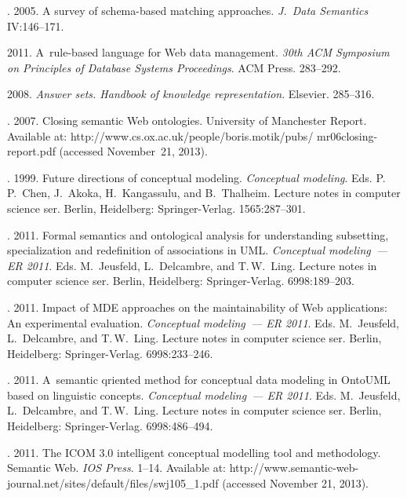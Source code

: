 \begin{multicols}{2}
{{\begin{thebibliography}{99}
. 2005. A survey of schema-based matching approaches.
\textit{J.~Data Semantics} IV:146--171.

 2011. A~rule-based
language for Web data management. \textit{30th ACM Symposium on Principles of
Database Systems Proceedings}. ACM Press. 283--292.


 2008. \textit{Answer sets. Handbook of knowledge representation}.
Elsevier. 285--316.

. 2007. Closing semantic Web ontologies. University of
Manchester Report. Available at: {\sf
http://www.cs.ox.ac.uk/people/boris.motik/pubs/ mr06closing-report.pdf} (accessed
November~21, 2013).

. 1999. Future directions of conceptual
modeling. \textit{Conceptual modeling}. Eds. P.\,P.~Chen, J.~Akoka, 
H.~Kangassulu, and B.~Thalheim.
Lecture notes in computer science ser. Berlin, Heidelberg:
Springer-Verlag. 1565:287--301.

. 2011. Formal
semantics and ontological analysis for understanding subsetting, specialization and
redefinition of associations in UML. \textit{Conceptual modeling~--- ER 2011}.
Eds. M.~Jeusfeld, L.~Delcambre, and T.\,W.~Ling. Lecture notes in computer
science ser. Berlin, Heidelberg: Springer-Verlag. 6998:189--203.

. 2011. Impact of
MDE approaches on the maintainability of Web applications: An experimental evaluation.
\textit{Conceptual modeling~--- ER 2011}.
Eds. M.~Jeusfeld, L.~Delcambre, and T.\,W.~Ling. Lecture notes in computer
science ser. Berlin, Heidelberg: Springer-Verlag. 6998:233--246.

. 2011. A~semantic
qriented method for conceptual data modeling in \mbox{OntoUML} based on linguistic concepts.
\textit{Conceptual modeling~--- ER 2011}.
Eds. M.~Jeusfeld, L.~Delcambre, and T.\,W.~Ling. Lecture notes in computer
science ser. Berlin, Heidelberg: Springer-Verlag. 6998:486--494.

. 2011. The ICOM 3.0 intelligent
conceptual modelling tool and methodology. Semantic Web. \textit{IOS Press}. 1--14.
Available at: {\sf http://www.semantic-web-journal.net/sites/default/files/swj105\_1.pdf}
(accessed November 21, 2013).


\end{thebibliography}}}
\end{multicols}
